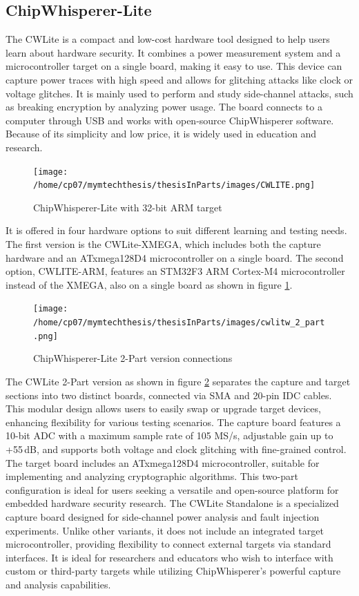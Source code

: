 \subsection{ChipWhisperer-Lite}
The CWLite is a compact and low-cost hardware tool designed to help users learn about hardware security. It combines a power measurement system and a microcontroller target on a single board, making it easy to use. This device \cite{chipwhisperer_lite_capture} can capture power traces with high speed and allows for glitching attacks like clock or voltage glitches. It is mainly used to perform and study side-channel attacks, such as breaking encryption by analyzing power usage. The board connects to a computer through USB and works with open-source ChipWhisperer software. Because of its simplicity and low price, it is widely used in education and research.
\begin{figure}[h]
    \centering
    \texttt{[image: /home/cp07/mymtechthesis/thesisInParts/images/CWLITE.png]}
    \caption{ChipWhisperer-Lite with 32-bit ARM target}
    \label{lite_target}
\end{figure}\newline
It is offered in four hardware options \cite{chipwhisperer_lite2} to suit different learning and testing needs. The first version is the CWLite-XMEGA, which includes both the capture hardware and an ATxmega128D4 microcontroller on a single board. The second option, CWLITE-ARM, features an STM32F3 ARM Cortex-M4 microcontroller instead of the XMEGA, also on a single board as shown in figure \ref{lite_target}. 
\begin{figure}[h]
    \centering
    \texttt{[image: /home/cp07/mymtechthesis/thesisInParts/images/cwlitw\_2\_part.png]}
    \caption{ChipWhisperer-Lite 2-Part version connections}
    \label{fig:lite_2_part}
\end{figure}\newline
The CWLite 2-Part version as shown in figure \ref{fig:lite_2_part} separates the capture and target sections into two distinct boards, connected via SMA and 20-pin IDC cables. This modular design allows users to easily swap or upgrade target devices, enhancing flexibility for various testing scenarios. The capture board features a 10-bit ADC with a maximum sample rate of 105 MS/s, adjustable gain up to +55\,dB, and supports both voltage and clock glitching with fine-grained control. The target board includes an ATxmega128D4 microcontroller, suitable for implementing and analyzing cryptographic algorithms. This two-part configuration is ideal for users seeking a versatile and open-source platform for embedded hardware security research.\newline
The CWLite Standalone is a specialized capture board designed for side-channel power analysis and fault injection experiments. Unlike other variants, it does not include an integrated target microcontroller, providing flexibility to connect external targets via standard interfaces. It is ideal for researchers and educators who wish to interface with custom or third-party targets while utilizing ChipWhisperer's powerful capture and analysis capabilities.


